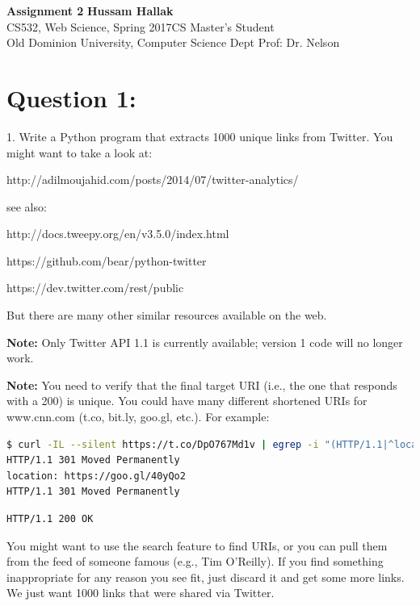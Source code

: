 \documentclass[a4paper, 11pt]{article}
\begin{document}
\noindent
\large\textbf{Assignment 2} \hfill \textbf{Hussam Hallak} \\
\normalsize CS532, Web Science, Spring 2017\hfill CS Master's Student \\
Old Dominion University, Computer Science Dept \hfill Prof: Dr. Nelson 

\section*{Question 1:}
1.  Write a Python program that extracts 1000 unique links from
Twitter.  You might want to take a look at:

http://adilmoujahid.com/posts/2014/07/twitter-analytics/

see also:

http://docs.tweepy.org/en/v3.5.0/index.html

https://github.com/bear/python-twitter

https://dev.twitter.com/rest/public

But there are many other similar resources available on the web.

\textbf{Note:}
Only Twitter API 1.1 is currently available; version 1
code will no longer work.

\textbf{Note:}
You need to verify that the final target URI (i.e.,
the one that responds with a 200) is unique.  You could have many
different shortened URIs for www.cnn.com (t.co, bit.ly, goo.gl,
etc.).  For example:


\begin{lstlisting}[language=bash,label=Command:, breakatwhitespace=〈false), caption=Command:]
$ curl -IL --silent https://t.co/DpO767Md1v | egrep -i "(HTTP/1.1|^location:)"
HTTP/1.1 301 Moved Permanently
location: https://goo.gl/40yQo2
HTTP/1.1 301 Moved Permanently
\end{lstlisting}
\nolinebreak
\begin{lstlisting}[language=bash]
HTTP/1.1 200 OK
\end{lstlisting}



You might want to use the search feature to find URIs, or you can
pull them from the feed of someone famous (e.g., Tim O'Reilly).  If
you find something inappropriate for any reason you see fit, just
discard it and get some more links.  We just want 1000 links that
were shared via Twitter.
\end{document}
